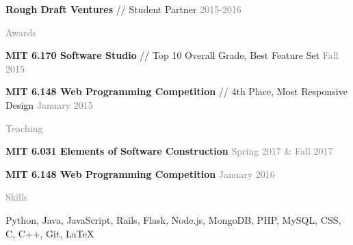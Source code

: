 \documentclass[11pt]{article}
\newcommand{\rsection}[1]{\vspace{1.5em}\textcolor{gray}{\Large \robotoslab #1}\vspace{0.5em}}
\newcommand{\bt}[1]{\textbf{#1}} %
\newcommand{\gap}[0]{\vspace{0.3em}} %
\newcommand{\sep}[0]{ // } %
\newcommand{\gray}[1]{\textcolor{gray}{#1}}
\begin{document}
\bt{Rough Draft Ventures}\sep Student Partner \hfill \gray{2015-2016}


\rsection{Awards}

\bt{MIT 6.170 Software Studio} \sep Top 10 Overall Grade, Best Feature Set \hfill \gray{Fall 2015}

\gap

\bt{MIT 6.148 Web Programming Competition} \sep 4th Place, Most Responsive Design \hfill \gray{January 2015}


\rsection{Teaching}

\bt{MIT 6.031 Elements of Software Construction} \hfill \gray{Spring 2017 \& Fall 2017}

\gap

\bt{MIT 6.148 Web Programming Competition} \hfill \gray{January 2016}


\rsection{Skills}

Python, Java, JavaScript, Rails, Flask, Node.js, MongoDB, PHP, MySQL, CSS, C, C++, Git, {\selectfont\LaTeX}
\end{document}
